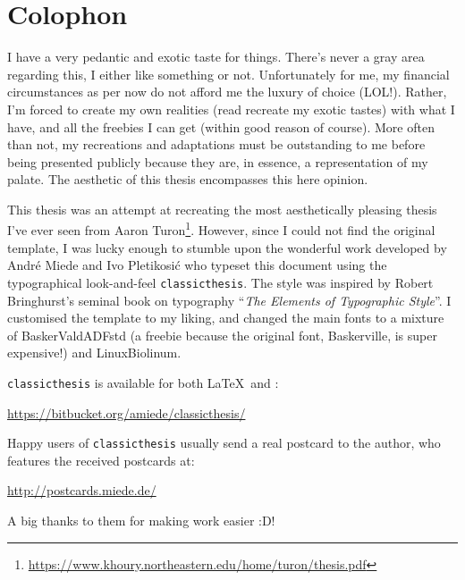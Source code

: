 \pagestyle{empty}

\hfill

\vfill


\section*{Colophon}
I have a very pedantic and exotic taste for things. There's never a gray area regarding this, I either like something or not. Unfortunately for me, my financial circumstances as per now do not afford me the luxury of choice (LOL!). Rather, I'm forced to create my own realities (read recreate my exotic tastes) with what I have, and all the freebies I can get (within good reason of course). More often than not, my recreations and adaptations must be outstanding to me before being presented publicly because they are, in essence, a representation of my palate. The aesthetic of this thesis encompasses this here opinion.

This thesis was an attempt at recreating the most aesthetically pleasing thesis I've ever seen from Aaron Turon\footnote{\url{https://www.khoury.northeastern.edu/home/turon/thesis.pdf}}. However, since I could not find the original template, I was lucky enough to stumble upon the wonderful work developed by Andr\'e Miede and Ivo Pletikosić who typeset this document using the typographical look-and-feel \texttt{classicthesis}. The style was inspired by Robert Bringhurst's seminal book on typography ``\emph{The Elements of Typographic Style}''. I customised the template to my liking, and changed the main fonts to a mixture of BaskerValdADFstd (a freebie because the original font, Baskerville, is super expensive!) and LinuxBiolinum.

\texttt{classicthesis} is available for both \LaTeX\ and \mLyX:
\begin{center}
\url{https://bitbucket.org/amiede/classicthesis/}
\end{center}
Happy users of \texttt{classicthesis} usually send a real postcard to the author, who features the received postcards at:
\begin{center}
\url{http://postcards.miede.de/}
\end{center}

A big thanks to them for making work easier :D!
\bigskip

\noindent\finalVersionString
